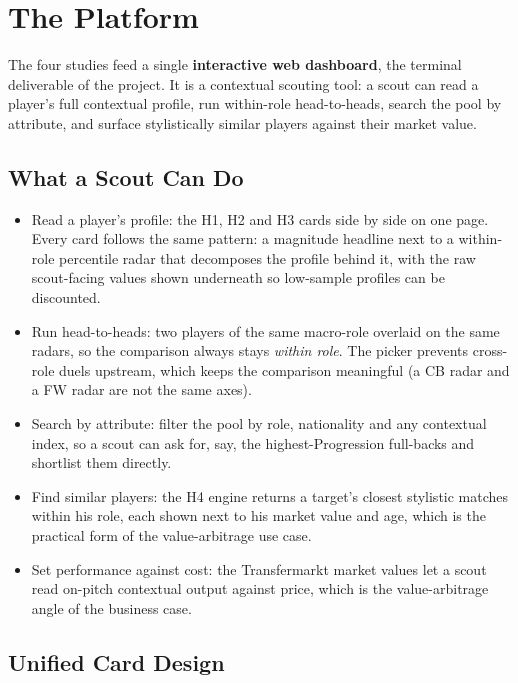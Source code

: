 \documentclass[12pt,a4paper]{article}
\begin{document}
\clearpage
\section{The Platform}\label{sec:platform}

The four studies feed a single \textbf{interactive web dashboard}, the terminal deliverable of the project.
It is a contextual scouting tool: a scout can read a player's full contextual profile, run within-role head-to-heads, search the pool by attribute, and surface stylistically similar players against their market value.

\subsection{What a Scout Can Do}\label{sec:scout}

\begin{itemize}
    \item Read a player's profile: the H1, H2 and H3 cards side by side on one page. Every card follows the same pattern: a magnitude headline next to a within-role percentile radar that decomposes the profile behind it, with the raw scout-facing values shown underneath so low-sample profiles can be discounted.
    \item Run head-to-heads: two players of the same macro-role overlaid on the same radars, so the comparison always stays \emph{within role}. The picker prevents cross-role duels upstream, which keeps the comparison meaningful (a CB radar and a FW radar are not the same axes).
    \item Search by attribute: filter the pool by role, nationality and any contextual index, so a scout can ask for, say, the highest-Progression full-backs and shortlist them directly.
    \item Find similar players: the H4 engine returns a target's closest stylistic matches within his role, each shown next to his market value and age, which is the practical form of the value-arbitrage use case.
    \item Set performance against cost: the Transfermarkt market values let a scout read on-pitch contextual output against price, which is the value-arbitrage angle of the business case.
\end{itemize}

\subsection{Unified Card Design}\label{sec:card}
\end{document}
